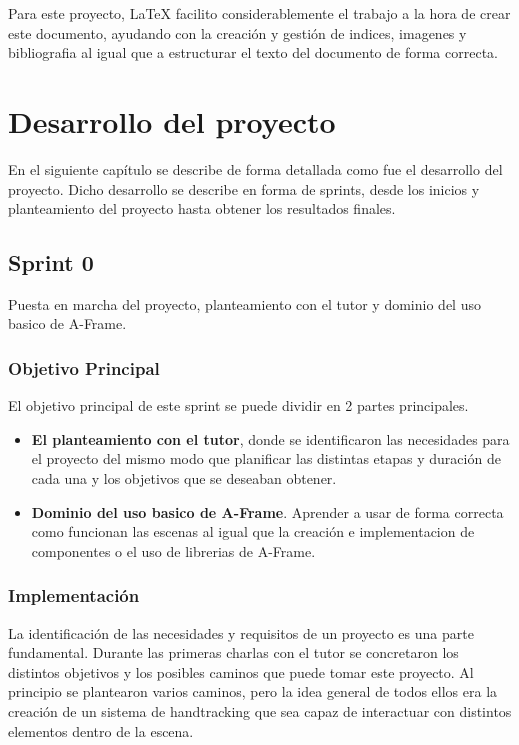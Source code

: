 \documentclass[a4paper, 12pt]{book}
\begin{document}
Para este proyecto, LaTeX facilito considerablemente el trabajo a la hora de crear este documento, ayudando con la creación y gestión de indices, imagenes y bibliografia al igual que a estructurar el texto del documento de forma correcta.

\cleardoublepage
\chapter{Desarrollo del proyecto}
\label{chap:Desarrollo del proyecto}
En el siguiente capítulo se describe de forma detallada como fue el desarrollo del proyecto. Dicho desarrollo
se describe en forma de sprints, desde los inicios y planteamiento del proyecto hasta obtener los resultados finales.

\section{Sprint 0}
\label{sec:sprint0}
Puesta en marcha del proyecto, planteamiento con el tutor y dominio del uso basico de A-Frame.
\subsection{Objetivo Principal}
\label{subsec:objetivo-principal0}
El objetivo principal de este sprint se puede dividir en 2 partes principales. 
\begin{itemize}
  \item \textbf{El planteamiento con el tutor}, donde se identificaron las necesidades para el proyecto del mismo modo que planificar las distintas etapas y duración de cada una
  y los objetivos que se deseaban obtener.
  \item \textbf{Dominio del uso basico de A-Frame}. Aprender a usar de forma correcta como funcionan las escenas al igual que la creación e implementacion de componentes o el uso de librerias de A-Frame.
\end{itemize}

\subsection{Implementación}
\label{subsec:implementacion0}
La identificación de las necesidades y requisitos de un proyecto es una parte fundamental. Durante las primeras charlas con el tutor se concretaron los distintos objetivos y los posibles caminos que puede tomar este proyecto. 
Al principio se plantearon varios caminos, pero la idea general de todos ellos era la creación de un sistema de handtracking que sea capaz de interactuar con distintos elementos dentro de la escena. 
\end{document}
